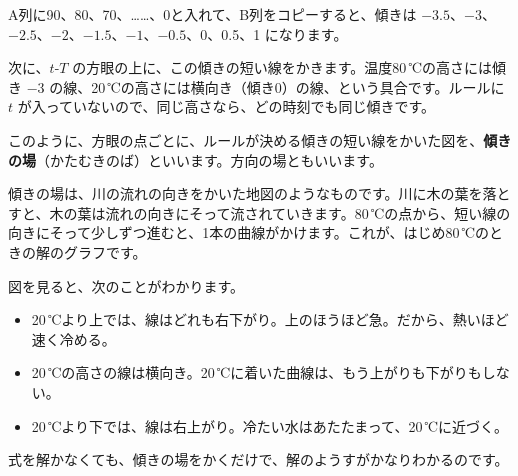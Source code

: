 \begin{bkcenter}
\label{bk:6-1:tab-sheet}
\end{bkcenter}

A列に90、80、70、……、0と入れて、B列をコピーすると、傾きは $-3.5$、$-3$、$-2.5$、$-2$、$-1.5$、$-1$、$-0.5$、0、0.5、1 になります。

次に、$t$-$T$ の方眼の上に、この傾きの短い線をかきます。温度80\,℃の高さには傾き $-3$ の線、20\,℃の高さには横向き（傾き0）の線、という具合です。ルールに $t$ が入っていないので、同じ高さなら、どの時刻でも同じ傾きです。

\begin{bkfigure}
\label{bk:6-1:fig-ba}
\end{bkfigure}

このように、方眼の点ごとに、ルールが決める傾きの短い線をかいた図を、\textbf{傾きの場}（かたむきのば）といいます。方向の場ともいいます。

傾きの場は、川の流れの向きをかいた地図のようなものです。川に木の葉を落とすと、木の葉は流れの向きにそって流されていきます。80\,℃の点から、短い線の向きにそって少しずつ進むと、1本の曲線がかけます。これが、はじめ80\,℃のときの解のグラフです。

図を見ると、次のことがわかります。
\begin{itemize}[leftmargin=1.2\zw, itemsep=1pt, topsep=2pt, label={\color{\bkTT}●}]
\item 20\,℃より上では、線はどれも右下がり。上のほうほど急。だから、熱いほど速く冷める。
\item 20\,℃の高さの線は横向き。20\,℃に着いた曲線は、もう上がりも下がりもしない。
\item 20\,℃より下では、線は右上がり。冷たい水はあたたまって、20\,℃に近づく。
\end{itemize}
式を解かなくても、傾きの場をかくだけで、解のようすがかなりわかるのです。

